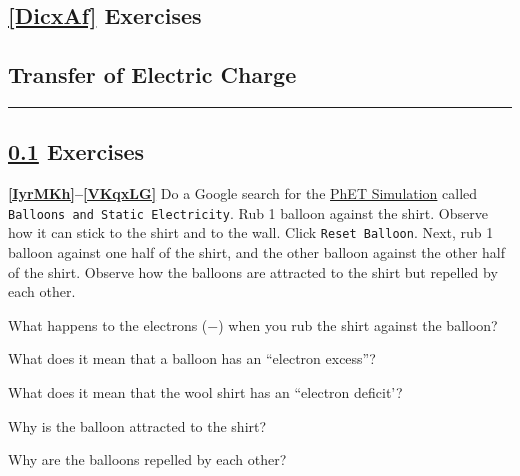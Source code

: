 \documentclass[dvipsnames]{article}
\begin{document}
\subsection*{\ref{DicxAf} Exercises}



\subsection{Transfer of Electric Charge} \label{XFJNUr}



\hrule

\begin{multicols}{2}

\subsection*{\ref{XFJNUr} Exercises}

\textbf{\ref{IyrMKh}--\ref{VKqxLG}} Do a Google search for the \href{https://phet.colorado.edu/en/simulations/balloons-and-static-electricity/about}{PhET Simulation} called \texttt{Balloons and Static Electricity}. Rub 1 balloon against the shirt. Observe how it can stick to the shirt and to the wall. Click \texttt{Reset Balloon}.
Next, rub 1 balloon against one half of the shirt, and the other balloon against the other half of the shirt. Observe how the balloons are attracted to the shirt but repelled by each other.

\begin{exercise} \label{IyrMKh}
    What happens to the electrons ($-$) when you rub the shirt against the balloon?
\end{exercise}

\begin{exercise}
    What does it mean that a balloon has an ``electron excess''?
\end{exercise}

\begin{exercise}
    What does it mean that the wool shirt has an ``electron deficit'?
\end{exercise}

\begin{exercise}
    Why is the balloon attracted to the shirt?
\end{exercise}

\begin{exercise} \label{VKqxLG}
    Why are the balloons repelled by each other?
\end{exercise}


\end{multicols}
\end{document}
